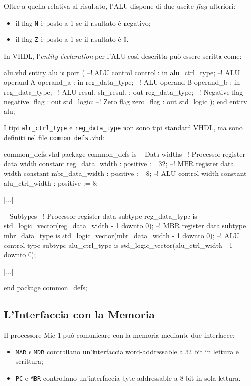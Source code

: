 \documentclass[a4paper,12pt]{scrreprt}
\begin{document}
Oltre a quella relativa al risultato, l'ALU dispone di due uscite \textit{flag}
ulteriori:
\begin{itemize}
  \item il flag \lstinline{N} è posto a 1 se il risultato è negativo;
  \item il flag \lstinline{Z} è posto a 1 se il risultato è 0.
\end{itemize}

In VHDL, l'\textit{entity declaration} per l'ALU così descritta può essere
scritta come:

\begin{myvhdl}{alu.vhd}
entity alu is
  port (
    --! ALU control
    control       : in  alu_ctrl_type;
    --! ALU operand A
    operand_a     : in  reg_data_type;
    --! ALU operand B
    operand_b     : in  reg_data_type;
    --! ALU result
    sh_result     : out reg_data_type;
    --! Negative flag
    negative_flag : out std_logic;
    --! Zero flag
    zero_flag     : out std_logic
    );
end entity alu;
\end{myvhdl}

I tipi \lstinline{alu_ctrl_type} e \lstinline{reg_data_type} non sono tipi
standard VHDL, ma sono definiti nel file \lstinline{common_defs.vhd}:

\begin{myvhdl}{common\_defs.vhd}
package common_defs is
  -- Data widths
  --! Processor register data width
  constant reg_data_width      : positive := 32;
  --! MBR register data width
  constant mbr_data_width      : positive := 8;
  --! ALU control width
  constant alu_ctrl_width      : positive := 8;

  [...]

  -- Subtypes
  --! Processor register data
  subtype reg_data_type is std_logic_vector(reg_data_width - 1 downto 0);
  --! MBR register data
  subtype mbr_data_type is std_logic_vector(mbr_data_width - 1 downto 0);
  --! ALU control type
  subtype alu_ctrl_type is std_logic_vector(alu_ctrl_width - 1 downto 0);

  [...]

end package common_defs;
\end{myvhdl}

\subsection{L'Interfaccia con la Memoria}

Il processore Mic-1 può comunicare con la memoria mediante due interfacce:
\begin{itemize}
  \item \lstinline{MAR} e \lstinline{MDR} controllano un'interfaccia
  word-addressable a 32 bit in lettura e scrittura;
  \item \lstinline{PC} e \lstinline{MBR} controllano un'interfaccia
  byte-addressable a 8 bit in sola lettura.
\end{itemize}
\end{document}
